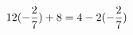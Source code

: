 \documentclass[preview]{standalone}
\begin{document}
\begin{align*}
\special{dvisvgm:raw <g id='unique000'>}12 (- \frac{2}{7}) + 8 = 4 - 2 (- \frac{2}{7})\special{dvisvgm:raw </g>}
\end{align*}
\end{document}

